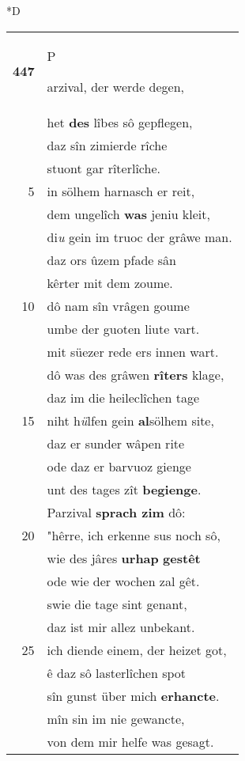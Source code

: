 \documentclass[8pt,a4paper,notitlepage]{article}
\begin{document}
\begin{table}[ht]
\begin{minipage}[t]{0.5\linewidth}
\small
\begin{center}*D
\end{center}
\begin{tabular}{rl}
\textbf{447} & \begin{large}P\end{large}arzival, der werde degen,\\ 
 & het \textbf{des} lîbes sô gepflegen,\\ 
 & daz sîn zimierde rîche\\ 
 & stuont gar rîterlîche.\\ 
5 & in sölhem harnasch er reit,\\ 
 & dem ungelîch \textbf{was} jeniu kleit,\\ 
 & di\textit{u} gein im truoc der grâwe man.\\ 
 & daz ors ûzem pfade sân\\ 
 & kêrter mit dem zoume.\\ 
10 & dô nam sîn vrâgen goume\\ 
 & umbe der guoten liute vart.\\ 
 & mit süezer rede ers innen wart.\\ 
 & dô was des grâwen \textbf{rîters} klage,\\ 
 & daz im die heileclîchen tage\\ 
15 & niht h\textit{ü}lfen gein \textbf{al}sölhem site,\\ 
 & daz er sunder wâpen rite\\ 
 & ode daz er barvuoz gienge\\ 
 & unt des tages zît \textbf{begienge}.\\ 
 & Parzival \textbf{sprach zim} dô:\\ 
20 & "hêrre, ich erkenne sus noch sô,\\ 
 & wie des jâres \textbf{urhap} \textbf{gestêt}\\ 
 & ode wie der wochen zal gêt.\\ 
 & swie die tage sint genant,\\ 
 & daz ist mir allez unbekant.\\ 
25 & ich diende einem, der heizet got,\\ 
 & ê daz sô lasterlîchen spot\\ 
 & sîn gunst über mich \textbf{erhancte}.\\ 
 & mîn sin im nie gewancte,\\ 
 & von dem mir helfe was gesagt.\\ 

\end{tabular}
\end{minipage}
\end{table}
\end{document}
